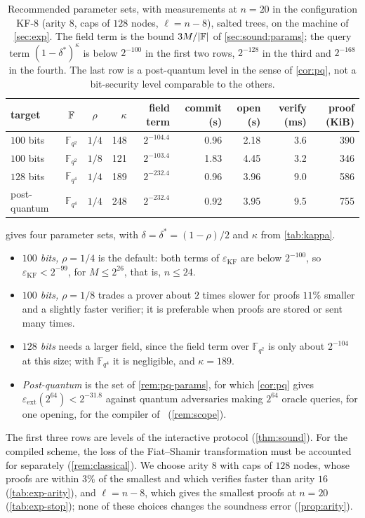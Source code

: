 \begin{table}[t]
\centering
\small
\setlength{\tabcolsep}{4pt}
\begin{tabular}{l c c r r rrrr}
\toprule
target & $\mathbb{F}$ & $\rho$ & $\kappa$ & field term & commit (s) & open (s) & verify (ms) & proof (KiB) \\
\midrule
$100$ bits & $\mathbb{F}_{q^2}$ & $1/4$ & 148 & $2^{-104.4}$ & 0.96 & 2.18 & 3.6 & 390 \\
$100$ bits & $\mathbb{F}_{q^2}$ & $1/8$ & 121 & $2^{-103.4}$ & 1.83 & 4.45 & 3.2 & 346 \\
$128$ bits & $\mathbb{F}_{q^4}$ & $1/4$ & 189 & $2^{-232.4}$ & 0.96 & 3.96 & 9.0 & 586 \\
post-quantum & $\mathbb{F}_{q^4}$ & $1/4$ & 248 & $2^{-232.4}$ & 0.92 & 3.95 & 9.5 & 755 \\
\bottomrule
\end{tabular}
\caption{Recommended parameter sets, with measurements at $n = 20$ in the configuration KF-8 (arity $8$, caps of $128$ nodes, $\ell = n - 8$), salted trees, on the machine of \cref{sec:exp}. The field term is the bound $3M/|\mathbb{F}|$ of \cref{sec:sound:params}; the query term $(1-\delta^*)^\kappa$ is below $2^{-100}$ in the first two rows, $2^{-128}$ in the third and $2^{-168}$ in the fourth. The last row is a post-quantum level in the sense of \cref{cor:pq}, not a bit-security level comparable to the others.}
\label{tab:apps-params}
\end{table}

 gives four parameter sets, with $\delta = \delta^* = (1-\rho)/2$ and $\kappa$ from \cref{tab:kappa}.
\begin{itemize}
  \item \emph{$100$ bits, $\rho = 1/4$} is the default: both terms of $\varepsilon_{\mathrm{KF}}$ are below $2^{-100}$, so $\varepsilon_{\mathrm{KF}} < 2^{-99}$, for $M \le 2^{26}$, that is, $n \le 24$.
  \item \emph{$100$ bits, $\rho = 1/8$} trades a prover about $2$ times slower for proofs $11\%$ smaller and a slightly faster verifier; it is preferable when proofs are stored or sent many times.
  \item \emph{$128$ bits} needs a larger field, since the field term over $\mathbb{F}_{q^2}$ is only about $2^{-104}$ at this size; with $\mathbb{F}_{q^4}$ it is negligible, and $\kappa = 189$.
  \item \emph{Post-quantum} is the set of \cref{rem:pq-params}, for which \cref{cor:pq} gives $\varepsilon_{\mathrm{ext}}(2^{64}) < 2^{-31.8}$ against quantum adversaries making $2^{64}$ oracle queries, for one opening, for the compiler of~\cite{CDHZ25} (\cref{rem:scope}).
\end{itemize}
The first three rows are levels of the interactive protocol (\cref{thm:sound}). For the compiled scheme, the loss of the Fiat--Shamir transformation must be accounted for separately (\cref{rem:classical}).
We choose arity $8$ with caps of $128$ nodes, whose proofs are within $3\%$ of the smallest and which verifies faster than arity $16$ (\cref{tab:exp-arity}), and $\ell = n - 8$, which gives the smallest proofs at $n = 20$ (\cref{tab:exp-stop}); none of these choices changes the soundness error (\cref{prop:arity}).

